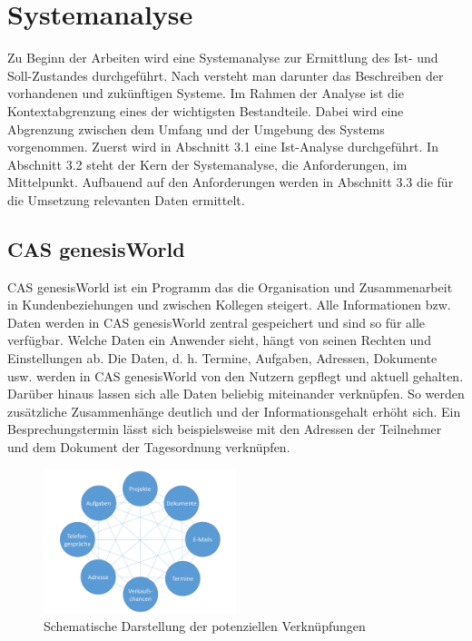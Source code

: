 
\chapter{Systemanalyse}
\label{ch:Systemanalyse}

Zu Beginn der Arbeiten wird eine Systemanalyse zur Ermittlung des Ist- und Soll-Zustandes durchgeführt. Nach \cite{SWB-380277719} versteht man darunter das Beschreiben der vorhandenen und zukünftigen Systeme. Im Rahmen der Analyse ist die Kontextabgrenzung eines der wichtigsten Bestandteile. Dabei wird eine Abgrenzung zwischen dem Umfang und der Umgebung des Systems vorgenommen. Zuerst wird in Abschnitt 3.1 eine Ist-Analyse durchgeführt. In Abschnitt 3.2 steht der Kern der Systemanalyse, die Anforderungen, im Mittelpunkt. Aufbauend auf den Anforderungen werden in Abschnitt 3.3 die für die Umsetzung relevanten Daten ermittelt. 

\section{CAS genesisWorld}
\label{ch:Systemanalyse:sec:genesisWorld}

CAS genesisWorld ist ein Programm das die Organisation und Zusammenarbeit in Kundenbeziehungen und zwischen Kollegen steigert. Alle Informationen bzw. Daten werden in CAS genesisWorld zentral gespeichert und sind so für alle verfügbar. Welche Daten ein Anwender sieht, hängt von seinen Rechten und Einstellungen ab. Die Daten, d. h. Termine, Aufgaben, Adressen, Dokumente usw. werden in CAS genesisWorld von den Nutzern gepflegt und aktuell gehalten. Darüber hinaus lassen sich alle Daten beliebig miteinander verknüpfen. So werden zusätzliche Zusammenhänge deutlich und der Informationsgehalt erhöht sich. Ein Besprechungstermin lässt sich beispielsweise mit den Adressen der Teilnehmer und dem Dokument der Tagesordnung verknüpfen.

\begin{figure}[H]
	\centering
  \includegraphics[width=0.5\textwidth, width=0.5\textwidth]{pics/CAS_connections.pdf}
	\caption{Schematische Darstellung der potenziellen Verknüpfungen}
	\label{picGwCon}
\end{figure}

